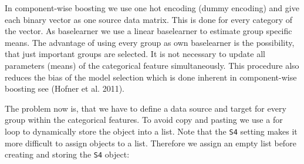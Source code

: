 \documentclass[]{article}
\newenvironment{Shaded}{\begin{snugshade}}{\end{snugshade}}
\newcommand{\KeywordTok}[1]{\textcolor[rgb]{0.13,0.29,0.53}{\textbf{#1}}}
\newcommand{\OperatorTok}[1]{\textcolor[rgb]{0.81,0.36,0.00}{\textbf{#1}}}
\newcommand{\NormalTok}[1]{#1}
\begin{document}
\begin{Shaded}
\end{Shaded}

In component-wise boosting we use one hot encoding (dummy encoding) and
give each binary vector as one source data matrix. This is done for
every category of the vector. As baselearner we use a linear baselearner
to estimate group specific means. The advantage of using every group as
own baselearner is the possibility, that just important groups are
selected. It is not necessary to update all parameters (means) of the
categorical feature simultaneously. This procedure also reduces the bias
of the model selection which is done inherent in component-wise boosting
see (Hofner et al. 2011).

The problem now is, that we have to define a data source and target for
every group within the categorical features. To avoid copy and pasting
we use a for loop to dynamically store the object into a list. Note that
the \texttt{S4} setting makes it more difficult to assign objects to a
list. Therefore we assign an empty list before creating and storing the
\texttt{S4} object:
\end{document}
